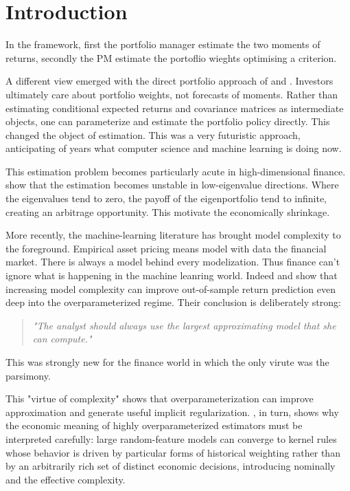 \section{Introduction}
In the \citet{markowitz1952} framework, first the portfolio manager estimate the two
moments of returns, secondly the PM estimate the portoflio wieghts optimising a criterion.

A different view emerged with the direct portfolio approach of
\citet{brandt1999} and \citet{brandtsantaclaravalkanov2009}. Investors ultimately care about
portfolio weights, not forecasts of moments. Rather than estimating conditional
expected returns and covariance matrices as intermediate objects, one can
parameterize and estimate the portfolio policy directly. This changed the
object of estimation. This was a very futuristic approach, anticipating of years what computer science and machine learning is doing now. 

This estimation problem becomes particularly acute in high-dimensional finance.
\citet{kozaknagelsantosh2020} show that the estimation becomes unstable in low-eigenvalue
directions. Where the eigenvalues tend to zero,  the payoff of the eigenportfolio tend to infinite, creating an arbitrage opportunity.  This motivate the economically shrinkage. 

More recently, the machine-learning literature has brought model complexity to
the foreground. Empirical asset pricing means model with data the financial market. There is always a model behind every modelization. 
Thus finance can't ignore what is happening in the machine leanring world. 
Indeed \citet{kellymalamudzhou2024} and \citet{kellymalamud2025} show that increasing model complexity can
improve out-of-sample return prediction even deep into the overparameterized
regime. Their conclusion is deliberately strong:

\begin{quote}
\emph{"The analyst should always use the largest approximating model that she
can compute."}
\end{quote}

This was strongly new for the finance world in which the only virute was the parsimony. 

This "virtue of complexity" shows that overparameterization can improve approximation and
generate useful implicit regularization.  
\citet{nagel2025}, in turn, shows why the economic meaning of highly
overparameterized estimators must be interpreted carefully: large random-feature
models can converge to kernel rules whose behavior is driven by particular
forms of historical weighting rather than by an arbitrarily rich set of
distinct economic decisions, introducing nominally and the effective complexity.

